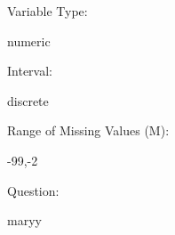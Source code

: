 \documentclass[
]{article}
\begin{document}
\begin{minipage}[t]{0.3\linewidth}

Variable Type:

\end{minipage}%
\begin{minipage}[t]{0.7\linewidth}

numeric

\end{minipage}

\begin{minipage}[t]{0.3\linewidth}

Interval:

\end{minipage}%
\begin{minipage}[t]{0.7\linewidth}

discrete

\end{minipage}

\begin{minipage}[t]{0.3\linewidth}

Range of Missing Values (M):

\end{minipage}%
\begin{minipage}[t]{0.7\linewidth}

-99,-2

\end{minipage}

\begin{minipage}[t]{0.3\linewidth}

Question:

\end{minipage}%
\begin{minipage}[t]{0.7\linewidth}

maryy

\end{minipage}
\end{document}
